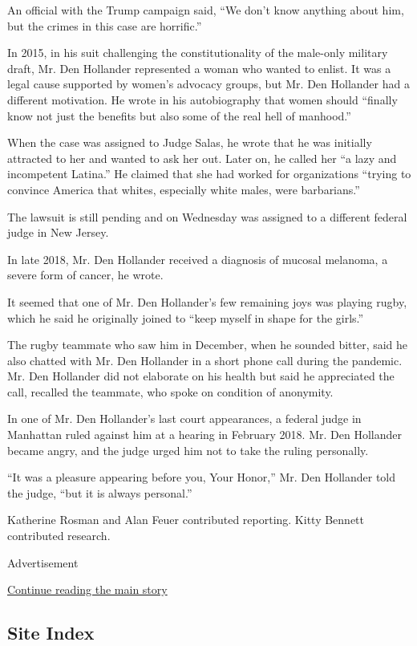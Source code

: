 An official with the Trump campaign said, ``We don't know anything about
him, but the crimes in this case are horrific.''

In 2015, in his suit challenging the constitutionality of the male-only
military draft, Mr. Den Hollander represented a woman who wanted to
enlist. It was a legal cause supported by women's advocacy groups, but
Mr. Den Hollander had a different motivation. He wrote in his
autobiography that women should ``finally know not just the benefits but
also some of the real hell of manhood.''

When the case was assigned to Judge Salas, he wrote that he was
initially attracted to her and wanted to ask her out. Later on, he
called her ``a lazy and incompetent Latina.'' He claimed that she had
worked for organizations ``trying to convince America that whites,
especially white males, were barbarians.''

The lawsuit is still pending and on Wednesday was assigned to a
different federal judge in New Jersey.

In late 2018, Mr. Den Hollander received a diagnosis of mucosal
melanoma, a severe form of cancer, he wrote.

It seemed that one of Mr. Den Hollander's few remaining joys was playing
rugby, which he said he originally joined to ``keep myself in shape for
the girls.''

The rugby teammate who saw him in December, when he sounded bitter, said
he also chatted with Mr. Den Hollander in a short phone call during the
pandemic. Mr. Den Hollander did not elaborate on his health but said he
appreciated the call, recalled the teammate, who spoke on condition of
anonymity.

In one of Mr. Den Hollander's last court appearances, a federal judge in
Manhattan ruled against him at a hearing in February 2018. Mr. Den
Hollander became angry, and the judge urged him not to take the ruling
personally.

``It was a pleasure appearing before you, Your Honor,'' Mr. Den
Hollander told the judge, ``but it is always personal.''

Katherine Rosman and Alan Feuer contributed reporting. Kitty Bennett
contributed research.

Advertisement

\protect\hyperlink{after-bottom}{Continue reading the main story}

\hypertarget{site-index}{%
\subsection{Site Index}\label{site-index}}

